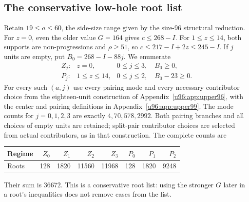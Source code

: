 \documentclass[11pt,a4paper]{article}
\theoremstyle{remark}
\begin{document}
\subsection{The conservative low-hole root list}
Retain $19\le a\le60$, the side-size range given by the size-96
structural reduction. For $z=0$, even the older value $G=164$ gives
$c\le268-I$. For $1\le z\le14$, both supports are non-progressions and
$\rho\ge51$, so $c\le217-I+2z\le245-I$. If $j$ units are empty, put
$B_0=268-I-88j$. We enumerate
\[
 \begin{array}{lll}
 Z_j:&z=0,&0\le j\le3,\quad B_0\ge0,\\
 P_j:&1\le z\le14,&0\le j\le2,\quad B_0-23\ge0.
 \end{array}
\]
For every such $(a,j)$ use every pairing mode and every necessary
contributor choice from the eighteen-unit construction of
Appendix~\ref{u96:app:upper96}, with the center and pairing definitions in Appendix~\ref{u96:app:upper99}. The mode counts
for $j=0,1,2,3$ are exactly $4,70,578,2992$. Both pairing branches and
all choices of empty units are retained; split-pair contributor choices
are selected from actual contributors, as in that construction.
The complete counts are
\begin{center}
\begin{tabular}{lrrrrrrr}
\toprule
Regime&$Z_0$&$Z_1$&$Z_2$&$Z_3$&$P_0$&$P_1$&$P_2$\\\midrule
Roots&128&1820&11560&11968&128&1820&9248\\\bottomrule
\end{tabular}
\end{center}
Their sum is 36672. This is a conservative root list: using the stronger
$G$ later in a root's inequalities does not remove cases from the list.
\end{document}
